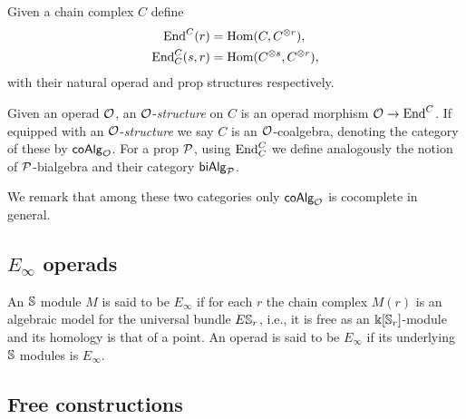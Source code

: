 Given a chain complex $C$ define
\begin{align*}
\End^C(r) &= \Hom(C, C^{\otimes r}), \\
\End^C_C(s, r) &= \Hom(C^{\otimes s}, C^{\otimes r}),
\end{align*}
with their natural operad and prop structures respectively.

Given an operad $\O$, an $\O$-\textit{structure} on $C$ is an operad morphism $\O \to \End^C$.
If equipped with an \mbox{$\O$-\textit{structure}} we say $C$ is an $\O$-coalgebra, denoting the category of these by $\coAlg_\O$.
For a prop $\P$, using $\End_C^C$ we define analogously the notion of $\P$-bialgebra and their category $\biAlg_\P$.

We remark that among these two categories only $\coAlg_\O$ is cocomplete in general.

\subsection{$E_\infty$ operads}

An $\S$ module $M$ is said to be $E_\infty$ if for each $r$ the chain complex $M(r)$ is an algebraic model for the universal bundle $E\S_r$, i.e., it is free as an $\k[\S_r]$-module and its homology is that of a point.
An operad is said to be $E_\infty$ if its underlying $\S$ modules is $E_\infty$.

\subsection{Free constructions} \label{ss:free constructions}

